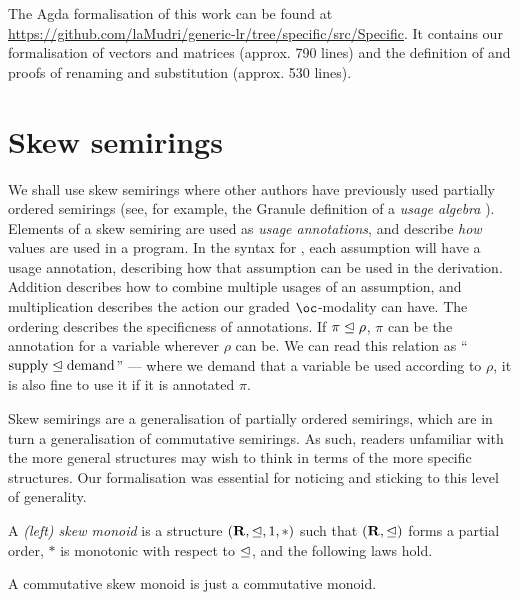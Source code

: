 \documentclass[submission,copyright,creativecommons]{eptcs}
\begin{document}
The Agda formalisation of this work can be found at
\url{https://github.com/laMudri/generic-lr/tree/specific/src/Specific}.
It contains our formalisation of vectors and
matrices (approx. 790 lines) and the definition of \name{} and proofs of
renaming and substitution (approx. 530 lines).

\section{Skew semirings}\label{sec:algebra}

We shall use skew semirings where other authors have previously used partially ordered
semirings (see, for example, the Granule definition of a \emph{usage algebra} \cite{Granule18}).
Elements of a skew semiring are used as \emph{usage annotations}, and describe
\emph{how} values are used in a program.
In the syntax for \name{}, each assumption will have a usage annotation,
describing how that assumption can be used in the derivation.
Addition describes how to combine multiple usages of an assumption, and
multiplication describes the action our graded $\oc$-modality can have.
The ordering describes the specificness of annotations.
If $\pi \trianglelefteq \rho$, $\pi$ can be the annotation for a variable wherever
$\rho$ can be.
We can read this relation as ``$\textrm{supply} \trianglelefteq \textrm{demand}$'' ---
where we demand that a variable be used according to $\rho$, it is also fine to
use it if it is annotated $\pi$.

Skew semirings are a generalisation of partially ordered semirings, which are in turn a
generalisation of commutative semirings.
As such, readers unfamiliar with the more general structures may wish to think
in terms of the more specific structures.
Our formalisation was essential for noticing and sticking to this level of
generality.

\begin{definition}
  A \emph{(left) skew monoid} is a structure $(\mathbf R, \trianglelefteq, 1, *)$ such
  that $(\mathbf R, \trianglelefteq)$ forms a partial order, $*$ is monotonic with
  respect to $\trianglelefteq$, and the following laws hold.
\end{definition}

\begin{remark}
  A commutative skew monoid is just a commutative monoid.
\end{remark}
\end{document}
